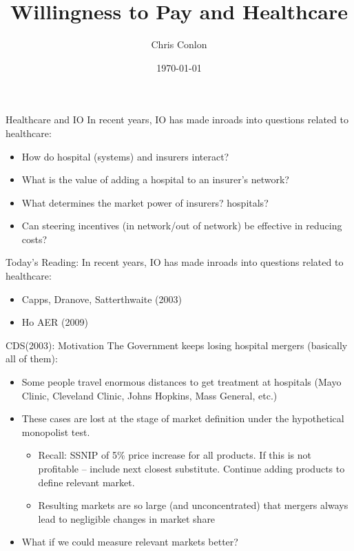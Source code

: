 \documentclass[aspectratio=169,10pt]{beamer}
\title [Healthcare and IO]{Willingness to Pay and Healthcare}
\author{Chris Conlon }
\institute{Grad IO }
\date{\today}
\begin{document}
\begin{frame}
\titlepage
\end{frame}


\begin{frame}{Healthcare and IO}
In recent years, IO has made inroads into questions related to healthcare:
\begin{itemize}
\item How do hospital (systems) and insurers interact?
\item What is the value of adding a hospital to an insurer's network?
\item What determines the market power of insurers? hospitals?
\item Can steering incentives (in network/out of network) be effective in reducing costs?
\end{itemize}
\end{frame}

\begin{frame}{Today's Reading:}
In recent years, IO has made inroads into questions related to healthcare:
\begin{itemize}
\item Capps, Dranove, Satterthwaite (2003)
\item Ho AER (2009)
\end{itemize}
\end{frame}



\begin{frame}{CDS(2003): Motivation}
The Government keeps losing hospital mergers (basically all of them):
\begin{itemize}
\item Some people travel enormous distances to get treatment at hospitals (Mayo Clinic, Cleveland Clinic, Johns Hopkins, Mass General, etc.)
\item These cases are lost at the stage of \alert{market definition} under the \alert{hypothetical monopolist test}.
\begin{itemize}
\item Recall: SSNIP of 5\% price increase for all products. If this is not profitable -- include next closest substitute. Continue adding products to define relevant market.
\item Resulting markets are so large (and unconcentrated) that mergers always lead to negligible changes in market share
\end{itemize}
\item What if we could measure relevant markets better?
\end{itemize}
\end{frame} 
\end{document}
